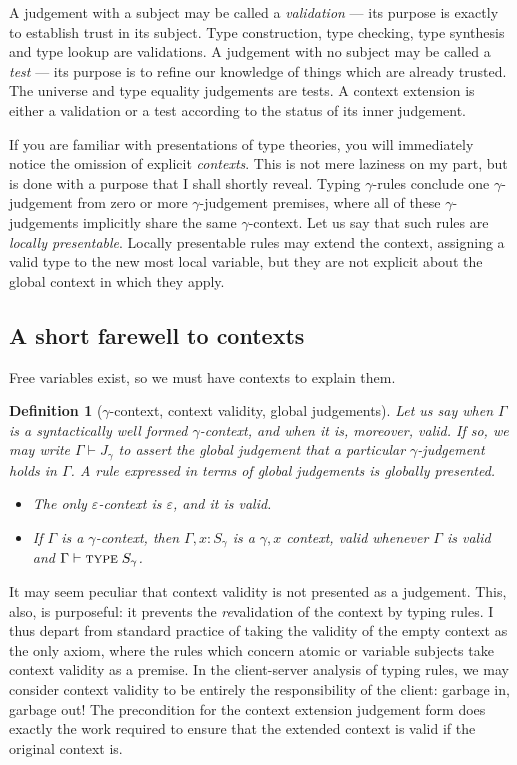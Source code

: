\documentclass{jfp1}
\newtheorem{definition}[theorem]{Definition}
\newcommand{\emp}{\varepsilon}
\begin{document}
A judgement with a subject may be called a \emph{validation} --- its
purpose is exactly to establish trust in its subject. Type construction, type checking, type synthesis and type lookup are validations. A judgement with no subject may be called a
\emph{test} --- its purpose is to refine our knowledge of things which are already trusted.
The universe and type equality judgements are tests. A context extension is either a validation
or a test according to the status of its inner judgement.

If you are familiar with presentations of type theories, you will immediately notice the
omission of explicit \emph{contexts}. This is not mere laziness on my part, but is done
with a purpose that I shall shortly reveal. Typing $\gamma$-rules conclude one $\gamma$-judgement
from zero or more $\gamma$-judgement premises, where all of these $\gamma$-judgements
implicitly share the same $\gamma$-context. Let us say that such rules are \emph{locally presentable}.
Locally presentable rules may extend the context, assigning a valid type to the new most local
variable, but they are not explicit about the global context in which they apply.


\subsection{A short farewell to contexts}

Free variables exist, so we must have contexts to explain them.

\begin{definition}[$\gamma$-context, context validity, global judgements]
  Let us say when $\Gamma$ is a syntactically well formed $\gamma$-context, and when it is,
  moreover, \emph{valid}. If so, we may write $\Gamma\vdash J_\gamma$ to assert
  the \emph{global judgement} that a particular $\gamma$-judgement holds in $\Gamma$.
  A rule expressed in terms of global judgements is \emph{globally presented}.
  \begin{itemize}
  \item The only $\emp$-context is $\emp$, and it is valid.
  \item If $\Gamma$ is a $\gamma$-context, then $\Gamma,x\!:\!S_\gamma$ is a $\gamma,x$ context,
    valid whenever $\Gamma$ is valid and $\Gamma\vdash\textsc{type}\;S_\gamma$.
  \end{itemize}
\end{definition}

It may seem peculiar that context validity is not presented as a
judgement. This, also, is purposeful: it prevents the
\emph{re}validation of the context by typing rules. I thus depart from
standard practice of taking the validity of the empty context as the
only axiom, where the rules which concern atomic or variable subjects
take context validity as a premise. In the client-server analysis of typing
rules, we may consider context validity to be entirely the responsibility
of the client: garbage in, garbage out! The precondition for the context
extension judgement form does exactly the work required to ensure that the
extended context is valid if the original context is.
\end{document}
